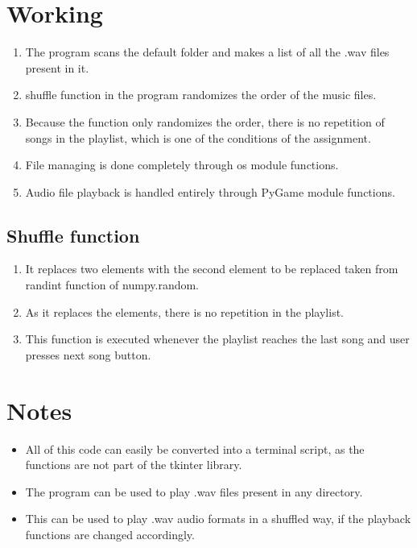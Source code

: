 \documentclass{article}
\begin{document}
\section{Working}
\begin{enumerate}
\item The program scans the default folder and makes a list of all the .wav files present in it.
\item shuffle function in the program randomizes the order of the music files.
\item Because the function only randomizes the order, there is no repetition of songs in the playlist, which is one of the conditions of the assignment.
\item File managing is done completely through os module functions.
\item Audio file playback is handled entirely through PyGame module functions.
\end{enumerate}
\subsection{Shuffle function}
\begin{enumerate}
\item It replaces two elements with the second element to be replaced taken from randint function of numpy.random.
\item As it replaces the elements, there is no repetition in the playlist.
\item This function is executed whenever the playlist reaches the last song and user presses next song button.
\end{enumerate}
\section{Notes}
\begin{itemize}
\item All of this code can easily be converted into a terminal script, as the functions are not part of the tkinter library.
\item The program can be used to play .wav files present in any directory.
\item This can be used to play .wav audio formats in a shuffled way, if the playback functions are changed accordingly.
\end{itemize}\
\end{document}
